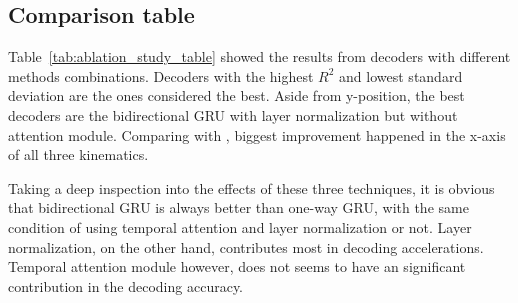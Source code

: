 \subsection{Comparison table}
\label{sec:ablation_study}
Table~\ref{tab:ablation_study_table} showed the results from decoders with different methods combinations.
Decoders with the highest $R^2$ and lowest standard deviation are the ones considered the best.
Aside from y-position, the best decoders are the bidirectional GRU with layer normalization but without attention module.
Comparing with \cite{makin2018}, biggest improvement happened in the x-axis of all three kinematics.

Taking a deep inspection into the effects of these three techniques,
it is obvious that bidirectional GRU is always better than one-way GRU, with the same condition of using temporal attention and layer normalization or not.
Layer normalization, on the other hand, contributes most in decoding accelerations.
Temporal attention module however,
does not seems to have an significant contribution in the decoding accuracy.


